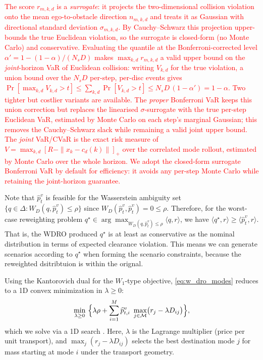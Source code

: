 \documentclass[letterpaper,10pt,conference]{ieeeconf}
\newcommand{\chg}[1]{\textcolor{red}{#1}}
\begin{document}
\chg{The score $r_{m,k,d}$ is a \emph{surrogate}: it projects the two-dimensional collision violation onto the mean ego-to-obstacle direction $n_{m,k,d}$ and treats it as Gaussian with directional standard deviation $\sigma_{m,k,d}$. By Cauchy--Schwarz this projection upper-bounds the true Euclidean violation, so the surrogate is closed-form (no Monte Carlo) and conservative. Evaluating the quantile at the Bonferroni-corrected level $\alpha' = 1-(1-\alpha)/(N_sD)$ makes $\max_{k,d} r_{m,k,d}$ a valid upper bound on the \emph{joint}-horizon VaR of Euclidean collision: writing $V_{k,d}$ for the true violation, a union bound over the $N_sD$ per-step, per-disc events gives $\Pr[\max_{k,d} V_{k,d} > t] \le \sum_{k,d}\Pr[V_{k,d}>t] \le N_sD\,(1-\alpha') = 1-\alpha$. Two tighter but costlier variants are available. The \emph{proper} Bonferroni VaR keeps this union correction but replaces the linearised $\sigma$-surrogate with the true per-step Euclidean VaR, estimated by Monte Carlo on each step's marginal Gaussian; this removes the Cauchy--Schwarz slack while remaining a valid joint upper bound. The \emph{joint} VaR/CVaR is the exact risk measure of $V=\max_{k,d}[R-\|x_k-c_d(k)\|]_+$ over the correlated mode rollout, estimated by Monte Carlo over the whole horizon. We adopt the closed-form surrogate Bonferroni VaR by default for efficiency: it avoids any per-step Monte Carlo while retaining the joint-horizon guarantee.}

Note that $\widehat p_t^v$ is feasible for the Wasserstein ambiguity set
$\{q \in \Delta : W_D(q,\widehat p_t^v)\le \rho\}$ since
$W_D(\widehat p_t^v,\widehat p_t^v)=0\le \rho$.
Therefore, for the worst-case reweighting problem
$q^\star \in \arg\max_{W_D(q,\widehat p_t^v)\le \rho}\langle q, r\rangle$,
we have
$\langle q^\star, r\rangle \ge \langle \widehat p_t^v, r\rangle$.
That is, the WDRO produced $q^\star$ is at least as conservative as the nominal
distribution in terms of expected clearance violation. This means we can generate scenarios
according to $q^\star$ when forming the scenario constraints, because the reweighted dsitribtuion is within the orignal. 

Using the Kantorovich dual for the $W_1$-type objective, \eqref{eq:w_dro_modes} reduces to a 1D convex minimization in $\lambda\ge 0$:
\begin{equation}\label{eq:w_dro_dual}
\min_{\lambda\ge 0}\ \Bigl\{
\lambda\rho+\sum_{i=1}^M \widehat p_{t,i}^v\ \max_{j\in\mathcal M}\bigl(r_j-\lambda D_{ij}\bigr)
\Bigr\},
\end{equation}
which we solve via a 1D search \cite{gao2022distributionallyrobuststochasticoptimization}.
Here, $\lambda$ is the Lagrange multiplier (price per unit transport), and $\max_j(r_j-\lambda D_{ij})$ selects the best destination mode $j$ for mass starting at mode $i$ under the transport geometry.
\end{document}
